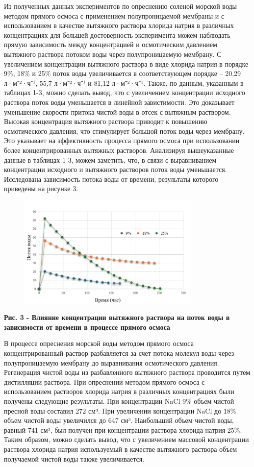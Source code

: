 Из полученных данных экспериментов по опреснению соленой морской воды
методом прямого осмоса с применением полупроницаемой мембраны и с
использованием в качестве вытяжного раствора хлорида натрия в различных
концентрациях для большей достоверность эксперимента можем наблюдать
прямую зависимость между концентрацией и осмотическим давлением
вытяжного раствора потоком воды через полупроницаемую мембрану. С
увеличением концентрации вытяжного раствора в виде хлорида натрия в
порядке 9\%, 18\% и 25\% поток воды увеличивается в соответствующем
порядке -- 20,29 л·м⁻²·ч⁻¹, 55,7 л·м⁻²·ч⁻¹ и 81,12 л·м⁻²·ч⁻¹. Также, по
данным, указанным в таблицах 1-3, можно сделать вывод, что с увеличением
концентрации исходного раствора поток воды уменьшается в линейной
завистимости. Это доказывает уменьшение скорости притока чистой воды в
отсек с вытяжным раствором. Высокая концентрация вытяжного раствора
приводит к повышению осмотического давления, что стимулирует большой
поток воды через мембрану. Это указывает на эффективность процесса
прямого осмоса при использовании более концентрированных вытяжных
растворов. Анализируя вышеуказанные данные в таблицах 1-3, можем
заметить, что, в связи с выравниванием концентрации исходного и
вытяжного растворов поток воды уменьшается. Исследована зависимость
потока воды от времени, результаты которого приведены на рисунке 3.

\begin{figure}[H]
	\centering
	\includegraphics[width=0.8\textwidth]{media/chem/image27}
	\caption*{}
\end{figure}


{\bfseries Рис. 3 - Влияние концентрации вытяжного раствора на поток воды в
зависимости от времени в процессе прямого осмоса}

В процессе опреснения морской воды методом прямого осмоса
концентрированный раствор разбавляется за счет потока молекул воды через
полупроницаемую мембрану до выравнивания осмотического давления.
Регенерация чистой воды из разбавленного вытяжного раствора проводится
путем дистилляции раствора. При опреснении методом прямого осмоса с
использованием растворов хлорида натрия в различных концентрациях были
получены следующие результаты. При концентрации NaCl 9\% объем чистой
пресной воды составил 272 см³. При увеличении концентрации NaCl до 18\%
объем чистой воды увеличился до 647 см³. Наибольший объем чистой воды,
равный 741 см³, был получен при концентрации раствора хлорида натрия
25\%. Таким образом, можно сделать вывод, что с увеличением массовой
концентрации раствора хлорида натрия используемый в качестве вытяжного
раствора объем получаемой чистой воды также увеличивается.

